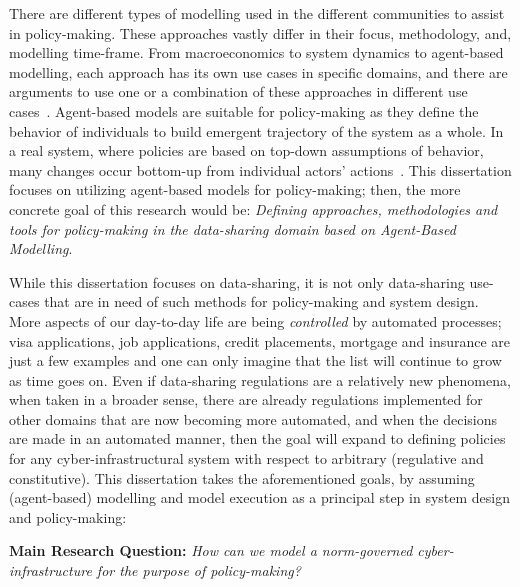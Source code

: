 There are different types of modelling used in the different communities to assist in policy-making. These approaches vastly differ in their focus, methodology, and, modelling time-frame. From macroeconomics to system dynamics to agent-based modelling, each approach has its own use cases in specific domains, and there are arguments to use one or a combination of these approaches in different use cases~\cite{Scholl2001,silverman2023,dosi2019,Dignum2008}. Agent-based models are suitable for policy-making as they define the behavior of individuals to build emergent trajectory of the system as a whole. In a real system, where policies are based on top-down assumptions of behavior, many changes occur bottom-up from individual actors' actions~\cite{Dignum2008}. This dissertation focuses on utilizing agent-based models for policy-making; then, the more concrete goal of this research would be: \textit{Defining approaches, methodologies and tools for policy-making in the data-sharing domain based on Agent-Based Modelling}.



While this dissertation focuses on data-sharing, it is not only data-sharing use-cases that are in need of such methods for policy-making and system design. More aspects of our day-to-day life are being \textit{controlled} by automated processes; visa applications, job applications, credit placements, mortgage and insurance are just a few examples and one can only imagine that the list will continue to grow as time goes on. Even if data-sharing regulations are a relatively new phenomena, when taken in a broader sense, there are already regulations implemented for other domains that are now becoming more automated, and when the decisions are made in an automated manner, then the goal will expand to defining policies for any cyber-infrastructural system with respect to arbitrary (regulative and constitutive). This dissertation takes the aforementioned goals, by assuming (agent-based) modelling and model execution as a principal step in system design and policy-making:

\begin{displayquote}
\textbf{Main Research Question:} \textit{How can we model a norm-governed cyber-infrastructure for the purpose of policy-making?}
\end{displayquote}



